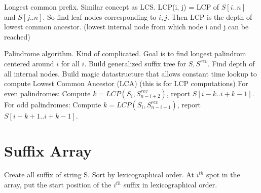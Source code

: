 \documentclass[10pt]{article}
\begin{document}
Longest common prefix. Similar concept as LCS. LCP(i, j) = LCP of $S[i .. n]$ and $S[j .. n]$.
So find leaf nodes corresponding to $i, j$. Then LCP is the depth of lowest common ancestor.
(lowest internal node from which node i and j can be reached)

Palindrome algorithm. Kind of complicated. Goal is to find longest palindrom centered around $i$ for all $i$.
Build generalized suffix tree for $S, S^{rev}$. Find depth of all internal nodes.
Build magic datastructure that allows constant time lookup to compute Lowest Common Ancestor (LCA) (this is for LCP computations)
For even palindromes: Compute $k = LCP(S_i, S^{rev}_{n-i+2})$, report $S[i-k .. i + k - 1]$. 
For odd palindromes: Compute $k = LCP(S_i, S^{rev}_{n-i+1})$, report $S[i-k + 1 .. i + k - 1]$. 

\section{Suffix Array}
Create all suffix of string S. Sort by lexicographical order.
At $i^{th}$ spot in the array, put the start position of the $i^{th}$ suffix in lexicographical order. 
\end{document}
